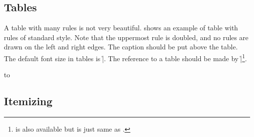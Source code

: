 
\subsection{Tables}
A table with many rules is not very beautiful.   shows
an example of table with rules of standard style.  Note that the uppermost
rule is doubled, and no rules are drawn on the left and right edges.  The
caption should be put above the table.  The default font size in tables is
\|\footnotesize|.  The reference to a table should be made by
\||\footnote{\cs{\Tabref} is also available but is just
same as \cs{\tabref}.}.

\begin{table}[b]
\caption{Sections and sub-sections in which list-like environments are used
(example of table)}
\label{tab:example}
\hbox to
\end{table}


\subsection{Itemizing}\label{sec:item*}

